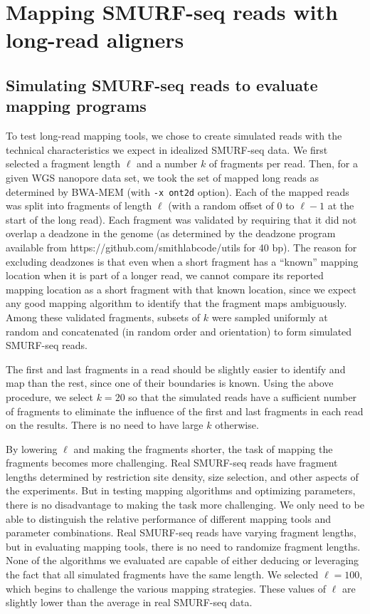 \chapter{Mapping SMURF-seq reads with long-read aligners}
\label{appendB}
\section*{Simulating SMURF-seq reads to evaluate mapping programs}
To test long-read mapping tools, we chose to create simulated reads with
the technical characteristics we expect in idealized SMURF-seq data. We
first selected a fragment length $\ell$ and a number $k$ of fragments
per read. Then, for a given WGS nanopore data set, we took the set of
mapped long reads as determined by BWA-MEM (with \texttt{-x ont2d}
option).  Each of the mapped reads was split into fragments of length
$\ell$ (with a random offset of $0$ to $\ell-1$ at the start of the long
read). Each fragment was validated by requiring that it did not overlap
a deadzone in the genome (as determined by the deadzone program
available from https://github.com/smithlabcode/utils for 40 bp). The
reason for excluding deadzones is that even when a short fragment has a
``known'' mapping location when it is part of a longer read, we cannot
compare its reported mapping location as a short fragment with that
known location, since we expect any good mapping algorithm to identify
that the fragment maps ambiguously. Among these validated fragments,
subsets of $k$ were sampled uniformly at random and concatenated (in
random order and orientation) to form simulated SMURF-seq reads.

The first and last fragments in a read should be slightly easier to
identify and map than the rest, since one of their boundaries is
known. Using the above procedure, we select $k=20$ so that the
simulated reads have a sufficient number of fragments to eliminate the
influence of the first and last fragments in each read on the
results. There is no need to have large $k$ otherwise.

By lowering $\ell$ and making the fragments shorter, the task of
mapping the fragments becomes more challenging. Real SMURF-seq reads
have fragment lengths determined by restriction site density, size
selection, and other aspects of the experiments. But in testing mapping
algorithms and optimizing parameters, there is no disadvantage to
making the task more challenging. We only need to be able to
distinguish the relative performance of different mapping tools and
parameter combinations. Real SMURF-seq reads have varying fragment
lengths, but in evaluating mapping tools, there is no need to
randomize fragment lengths. None of the algorithms we evaluated are
capable of either deducing or leveraging the fact that all simulated
fragments have the same length. We selected $\ell = 100$, which
begins to challenge the various mapping strategies. These values of
$\ell$ are slightly lower than the average in real SMURF-seq data.


